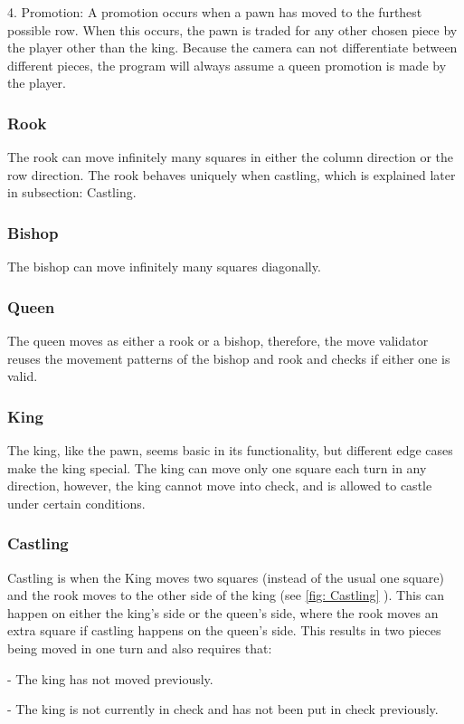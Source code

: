 4. Promotion: A promotion occurs when a pawn has moved to the furthest possible row. When this occurs, the pawn is traded for any other chosen piece by the player other than the king. Because the camera can not differentiate between different pieces, the program will always assume a queen promotion is made by the player.

\subsubsection{Rook}
The rook can move infinitely many squares in either the column direction or the row direction. The rook behaves uniquely when castling, which is explained later in subsection: Castling.

\subsubsection{Bishop}
The bishop can move infinitely many squares diagonally.

\subsubsection{Queen}
The queen moves as either a rook or a bishop, therefore, the move validator reuses the movement patterns of the bishop and rook and checks if either one is valid.

\subsubsection{King}
The king, like the pawn, seems basic in its functionality, but different edge cases make the king special. The king can move only one square each turn in any direction, however, the king cannot move into check, and is allowed to castle under certain conditions.

\subsubsection{Castling}
Castling is when the King moves two squares (instead of the usual one square) and the rook moves to the other side of the king (see \cref{fig: Castling} ). This can happen on either the king's side or the queen's side, where the rook moves an extra square if castling happens on the queen's side. This results in two pieces being moved in one turn and also requires that:

- The king has not moved previously.

- The king is not currently in check and has not been put in check previously.

